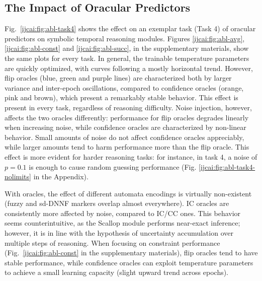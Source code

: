 \subsection{The Impact of Oracular Predictors}
Fig.~\ref{ijcai:fig:abl-task4} shows the effect on an exemplar task (Task 4) of oracular predictors on symbolic temporal reasoning modules.
Figures \ref{ijcai:fig:abl-avg}, \ref{ijcai:fig:abl-const} and \ref{ijcai:fig:abl-succ}, in the supplementary materials, show the same plots for every task.
%
In general, the trainable temperature parameters are quickly optimized, with curves following a mostly horizontal trend. However, flip oracles (blue, green and purple lines) are characterized both by larger variance and inter-epoch oscillations, compared to confidence oracles (orange, pink and brown), which present a remarkably stable behavior. This effect is present in every task, regardless of reasoning difficulty.
%
Noise injection, however, affects the two oracles differently: performance for flip oracles degrades linearly when increasing noise, while confidence oracles are characterized by non-linear behavior. Small amounts of noise do not affect confidence oracles appreciably, while larger amounts tend to harm performance more than the flip oracle. This effect is more evident for harder reasoning tasks: for instance, in task 4, a noise of $p = 0.1$ is enough to cause random guessing performance (Fig. \ref{ijcai:fig:abl-task4-nolimits} in the Appendix).
%

With oracles, the effect of different automata encodings is virtually non-existent (fuzzy and sd-DNNF markers overlap almost everywhere). 
%
\textsc{IC} oracles are consistently more affected by noise, compared to \textsc{IC/CC} ones. This behavior seems counterintuitive, as the Scallop module performs near-exact inference; however, it is in line with the hypothesis of uncertainty accumulation over multiple steps of reasoning.
%
When focusing on constraint performance (Fig.~\ref{ijcai:fig:abl-const} in the supplementary materials), flip oracles tend to have stable performance, while confidence oracles can exploit temperature parameters to achieve a small learning capacity (slight upward trend across epochs).
